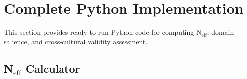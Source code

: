 
\section{Complete Python Implementation}
\label{sec:bj-python}

\begin{tcolorbox}[colback=blue!5!white, colframe=blue!75!black, title=Purpose]
This section provides ready-to-run Python code for computing N$_{\text{eff}}$,
domain salience, and cross-cultural validity assessment.
\end{tcolorbox}

\subsection{N$_{\text{eff}}$ Calculator}

